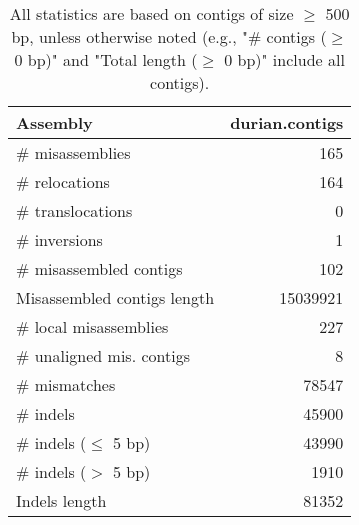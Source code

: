 \documentclass[12pt,a4paper]{article}
\begin{document}
\begin{table}[ht]
\begin{center}
\caption{All statistics are based on contigs of size $\geq$ 500 bp, unless otherwise noted (e.g., "\# contigs ($\geq$ 0 bp)" and "Total length ($\geq$ 0 bp)" include all contigs).}
\begin{tabular}{|l*{1}{|r}|}
\hline
Assembly & durian.contigs \\ \hline
\# misassemblies & 165 \\ \hline
\hspace{5mm}\# relocations & 164 \\ \hline
\hspace{5mm}\# translocations & 0 \\ \hline
\hspace{5mm}\# inversions & 1 \\ \hline
\# misassembled contigs & 102 \\ \hline
Misassembled contigs length & 15039921 \\ \hline
\# local misassemblies & 227 \\ \hline
\# unaligned mis. contigs & 8 \\ \hline
\# mismatches & 78547 \\ \hline
\# indels & 45900 \\ \hline
\hspace{5mm}\# indels ($\leq$ 5 bp) & 43990 \\ \hline
\hspace{5mm}\# indels ($>$ 5 bp) & 1910 \\ \hline
Indels length & 81352 \\ \hline
\end{tabular}
\end{center}
\end{table}
\end{document}

